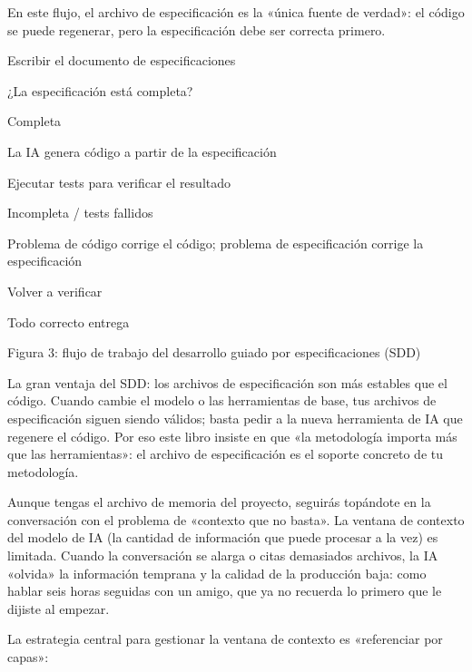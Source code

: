 En este flujo, el archivo de especificación es la «única fuente de verdad»: el código se puede regenerar, pero la especificación debe ser correcta primero.

Escribir el documento de especificaciones

¿La especificación está completa?

Completa

La IA genera código a partir de la especificación

Ejecutar tests para verificar el resultado

Incompleta / tests fallidos

Problema de código corrige el código; problema de especificación corrige la especificación

Volver a verificar

Todo correcto entrega

\begin{center}\small\color{gray}Figura 3: flujo de trabajo del desarrollo guiado por especificaciones (SDD)\end{center}

La gran ventaja del SDD: los archivos de especificación son más estables que el código. Cuando cambie el modelo o las herramientas de base, tus archivos de especificación siguen siendo válidos; basta pedir a la nueva herramienta de IA que regenere el código. Por eso este libro insiste en que «la metodología importa más que las herramientas»: el archivo de especificación es el soporte concreto de tu metodología.


Aunque tengas el archivo de memoria del proyecto, seguirás topándote en la conversación con el problema de «contexto que no basta». La ventana de contexto del modelo de IA (la cantidad de información que puede procesar a la vez) es limitada. Cuando la conversación se alarga o citas demasiados archivos, la IA «olvida» la información temprana y la calidad de la producción baja: como hablar seis horas seguidas con un amigo, que ya no recuerda lo primero que le dijiste al empezar.

La estrategia central para gestionar la ventana de contexto es «referenciar por capas»:

